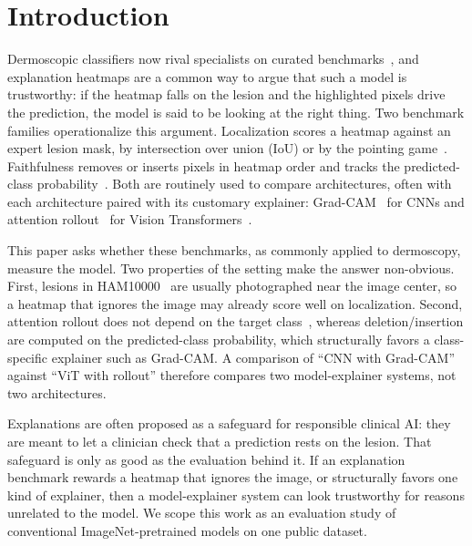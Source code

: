 \section{Introduction}
\label{sec:intro}

Dermoscopic classifiers now rival specialists on curated benchmarks~\cite{esteva2017dermatologist}, and
explanation heatmaps are a common way to argue that such a model is trustworthy: if the heatmap falls on
the lesion and the highlighted pixels drive the prediction, the model is said to be looking at the right
thing. Two benchmark families operationalize this argument. Localization scores a heatmap against an
expert lesion mask, by intersection over union (IoU) or by the pointing game~\cite{zhang2016topdown}.
Faithfulness removes or inserts pixels in heatmap order and tracks the predicted-class
probability~\cite{petsiuk2018rise,samek2017evaluating}. Both are routinely used to compare architectures,
often with each architecture paired with its customary explainer: Grad-CAM~\cite{selvaraju2017gradcam}
for CNNs and attention rollout~\cite{abnar2020attention} for Vision Transformers~\cite{kozachok2026melanoscope}.

This paper asks whether these benchmarks, as commonly applied to dermoscopy, measure the model. Two
properties of the setting make the answer non-obvious. First, lesions in HAM10000~\cite{tschandl2018ham10000}
are usually photographed near the image center, so a heatmap that ignores the image may already score
well on localization. Second, attention rollout does not depend on the target class~\cite{chefer2021transformer},
whereas deletion/insertion are computed on the predicted-class probability, which structurally favors a
class-specific explainer such as Grad-CAM. A comparison of ``CNN with Grad-CAM'' against ``ViT with
rollout'' therefore compares two model-explainer systems, not two architectures.

Explanations are often proposed as a safeguard for responsible clinical AI: they are meant to let a clinician
check that a prediction rests on the lesion. That safeguard is only as good as the evaluation behind it. If
an explanation benchmark rewards a heatmap that ignores the image, or structurally favors one kind of
explainer, then a model-explainer system can look trustworthy for reasons unrelated to the model. We scope
this work as an evaluation study of conventional ImageNet-pretrained models on one public dataset.

